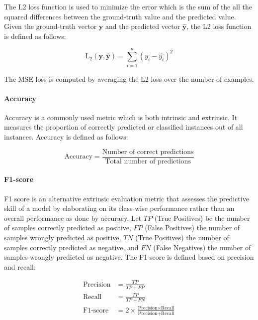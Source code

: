 The L2 loss function is used to minimize the error which is the sum of the all the squared differences between the ground-truth value and the predicted value. Given the ground-truth vector $\bm{y}$ and the predicted vector $\bm{\hat{y}}$, the L2 loss function is defined as follows:

\begin{equation}
    \text{L}_2 (\bm{y}, \bm{\hat{y}}) = \sum^n_{i=1} (y_i-\hat{y_i})^2
\end{equation}

The \ac{MSE} loss is computed by averaging the L2 loss over the number of examples.

\paragraph{Accuracy}

Accuracy is a commonly used metric which is both intrinsic and extrinsic. It measures the proportion of correctly predicted or classified instances out of all instances. Accuracy is defined as follows:

\begin{equation}
    \text{Accuracy} = \frac{\text{Number of correct predictions}}{\text{Total number of predictions}}
\end{equation}

\paragraph{F1-score} F1 score is an alternative extrinsic evaluation metric that assesses the predictive skill of a model by elaborating on its class-wise performance rather than an overall performance as done by accuracy. Let $TP$ (True Positives) be the number of samples correctly predicted as positive, $FP$ (False Positives) the number of samples wrongly predicted as positive, $TN$ (True Positives) the number of samples correctly predicted as negative, and $FN$ (False Negatives) the number of samples wrongly predicted as negative. The F1 score is defined based on precision and recall:

\begin{equation}
    \begin{aligned}
        \text{Precision} &= \frac{TP}{TP + FP} \\
        \text{Recall} &= \frac{TP}{TP + FN} \\
        \text{F1-score} &= 2 \times \frac{\text{Precision} \times \text{Recall}}{\text{Precision} + \text{Recall}}
    \end{aligned}
\end{equation}

